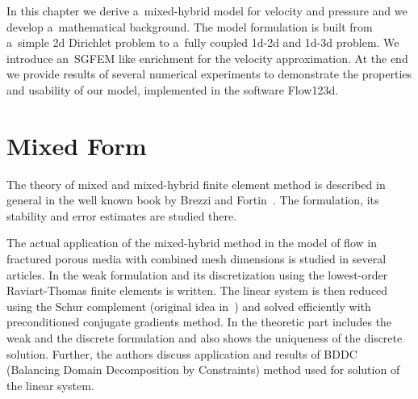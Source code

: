 
% 

In this chapter we derive a~mixed-hybrid model for velocity and pressure and we develop a~mathematical background.
The model formulation is built from a~simple 2d Dirichlet problem to a~fully coupled 1d-2d and 1d-3d problem.
We introduce an~SGFEM like enrichment for the velocity approximation.
At the end we provide results of several numerical experiments to demonstrate the properties and usability of our model,
implemented in the software Flow123d.


\section{Mixed Form}
The theory of mixed and mixed-hybrid finite element method is described in general in the well known book by 
Brezzi and Fortin~\cite{brezzi_mixed_1991}. 
The formulation, its stability and error estimates are studied there.

The actual application of the mixed-hybrid method in the model of flow in fractured porous 
media with combined mesh dimensions is studied in several articles.
In \cite{brezina_mixed-hybrid_2010} the weak formulation and its discretization using the lowest-order Raviart-Thomas finite 
elements is written. The linear system is then reduced using the Schur complement (original idea in~\cite{maryska_mixed-hybrid_1995})
and solved efficiently with preconditioned conjugate gradients method.
In \cite{sistek_bddc_2015} the theoretic part includes the weak and the discrete formulation and also shows
the uniqueness of the discrete solution. Further, the authors discuss application and results of BDDC 
(Balancing Domain Decomposition by Constraints) method used for solution of the linear system.

